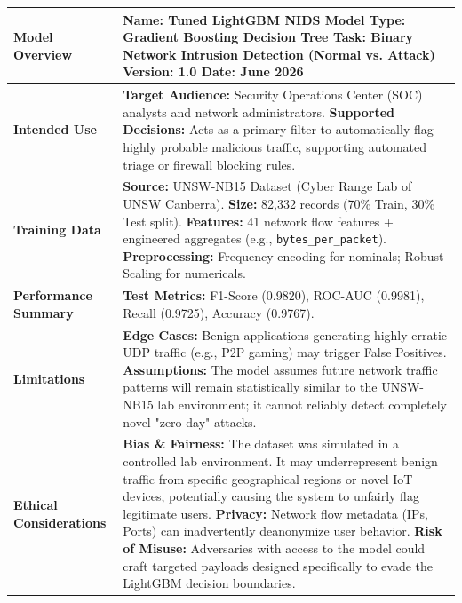 \documentclass[12pt, a4paper]{article}
\begin{document}
\begin{table}[H]
\centering
\renewcommand{\arraystretch}{1.5}
\begin{tabular}{|p{}|p{}|}
\hline
\textbf{Model Overview} & \textbf{Name:} Tuned LightGBM NIDS Model \newline \textbf{Type:} Gradient Boosting Decision Tree \newline \textbf{Task:} Binary Network Intrusion Detection (Normal vs. Attack) \newline \textbf{Version:} 1.0 \newline \textbf{Date:} June 2026 \\
\hline
\textbf{Intended Use} & \textbf{Target Audience:} Security Operations Center (SOC) analysts and network administrators. \newline \textbf{Supported Decisions:} Acts as a primary filter to automatically flag highly probable malicious traffic, supporting automated triage or firewall blocking rules. \\
\hline
\textbf{Training Data} & \textbf{Source:} UNSW-NB15 Dataset (Cyber Range Lab of UNSW Canberra). \newline \textbf{Size:} 82,332 records (70\% Train, 30\% Test split). \newline \textbf{Features:} 41 network flow features + engineered aggregates (e.g., \texttt{bytes\_per\_packet}). \newline \textbf{Preprocessing:} Frequency encoding for nominals; Robust Scaling for numericals. \\
\hline
\textbf{Performance Summary} & \textbf{Test Metrics:} F1-Score (0.9820), ROC-AUC (0.9981), Recall (0.9725), Accuracy (0.9767). \\
\hline
\textbf{Limitations} & \textbf{Edge Cases:} Benign applications generating highly erratic UDP traffic (e.g., P2P gaming) may trigger False Positives. \newline \textbf{Assumptions:} The model assumes future network traffic patterns will remain statistically similar to the UNSW-NB15 lab environment; it cannot reliably detect completely novel "zero-day" attacks. \\
\hline
\textbf{Ethical Considerations} & \textbf{Bias \& Fairness:} The dataset was simulated in a controlled lab environment. It may underrepresent benign traffic from specific geographical regions or novel IoT devices, potentially causing the system to unfairly flag legitimate users. \newline \textbf{Privacy:} Network flow metadata (IPs, Ports) can inadvertently deanonymize user behavior. \newline \textbf{Risk of Misuse:} Adversaries with access to the model could craft targeted payloads designed specifically to evade the LightGBM decision boundaries. \\

\end{tabular}
\end{table}
\end{document}
